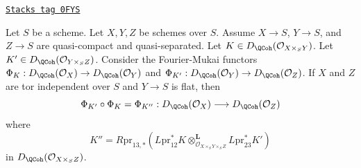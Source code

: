 \begin{lemma}
\label{equiv-lemma-compose-fourier-mukai}
\href{https://stacks.math.columbia.edu/tag/0FYS}{\texttt{Stacks tag 0FYS}}

Let $S$ be a scheme. Let $X, Y, Z$ be schemes over $S$. Assume
$X \to S$, $Y \to S$, and $Z \to S$ are quasi-compact and quasi-separated.
Let $K \in D_\QCoh(\mathcal{O}_{X \times_S Y})$.
Let $K' \in D_\QCoh(\mathcal{O}_{Y \times_S Z})$.
Consider the Fourier-Mukai functors
$\Phi_K : D_\QCoh(\mathcal{O}_X) \to D_\QCoh(\mathcal{O}_Y)$
and $\Phi_{K'} : D_\QCoh(\mathcal{O}_Y) \to D_\QCoh(\mathcal{O}_Z)$.
If $X$ and $Z$ are tor independent over $S$ and $Y \to S$ is flat,
then
$$
\Phi_{K'} \circ \Phi_K = \Phi_{K''} :
D_\QCoh(\mathcal{O}_X)
\longrightarrow
D_\QCoh(\mathcal{O}_Z)
$$
where
$$
K'' = R\text{pr}_{13, *}(
L\text{pr}_{12}^*K
\otimes_{\mathcal{O}_{X \times_S Y \times_S Z}}^\mathbf{L}
L\text{pr}_{23}^*K')
$$
in $D_\QCoh(\mathcal{O}_{X \times_S Z})$.
\end{lemma}

